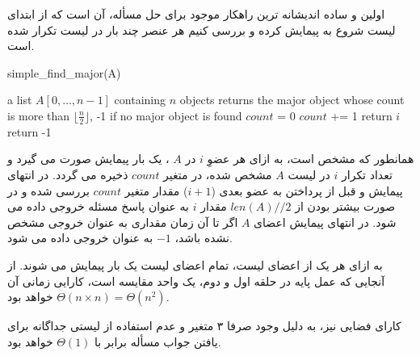 \documentclass{article}
\begin{document}
اولین و ساده اندیشانه ترین راهکار موجود برای حل مسأله، 
آن است که از ابتدای لیست شروع به پیمایش کرده و بررسی کنیم 
هر عنصر چند بار در لیست تکرار شده است.

\begin{latin}
    \begin{algorithm}[H]
        \caption*{simple\_find\_major(A)}
        \begin{algorithmic}
            \Require a list $A[0, \ldots, n-1]$ containing $n$ objects
            \Ensure returns the major object whose count is more than $\lfloor \frac{n}{2} \rfloor$,
            -1 if no major object is found
                \State $count$ = 0
                        \State $count$ += 1
                    \EndIf
                \EndFor
                    \State return $i$
                \EndIf
            \EndFor
            \State return -1
        \end{algorithmic}
    \end{algorithm}
\end{latin}

همانطور که مشخص است، به ازای هر عضوِ
$i$
در
$A$
،
یک بار پیمایش صورت می گیرد و تعداد تکرار
$i$
در لیست
$A$
مشخص شده، در متغیر
$count$
ذخیره می گردد.
در انتهای پیمایش و قبل از پرداختن به عضو بعدی
($i + 1$)
مقدار متغیر
$count$
بررسی شده و در صورت بیشتر بودن از
$len(A) // 2$
مقدار
$i$
به عنوان پاسخ مسئله خروجی داده می شود.
در انتهای پیمایش اعضای
$A$
اگر تا آن زمان مقداری به عنوان خروجی مشخص نشده باشد،
$-1$
به عنوان خروجی داده می شود.

به ازای هر یک از اعضای لیست، تمام اعضای لیست یک بار پیمایش
می شوند. از آنجایی که عمل پایه در حلقه اول و دوم، یک واحد مقایسه است، کارایی زمانی آن
$\Theta(n \times n) = \Theta(n^2)$
خواهد بود. 

کارای فضایی نیز، به دلیل وجود صرفا ۳ متغیر و 
عدم استفاده از لیستی جداگانه برای یافتن جواب مسأله
برابر با
$\Theta(1)$
خواهد بود.
\end{document}
